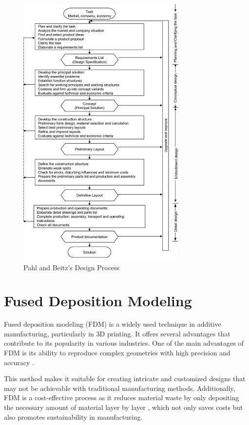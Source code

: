 \begin{figure}[ht!]
  \centering
  \includegraphics[width=0.75\textwidth]{texs/Part1/chapter1/image/pahlprocess.png}
  \caption{Pahl and Beitz's Design Process \cite[130]{Pahl2007}}
  \label{fig:pahlprocess}
\end{figure}

\section{Fused Deposition Modeling}
\label{sec:fused_deposition_modeling}

Fused deposition modeling (FDM) is a widely used technique in additive manufacturing, particularly in 3D printing. It offers several advantages that contribute to its popularity in various industries. One of the main advantages of FDM is its ability to reproduce complex geometries with high precision and accuracy \cite{Gordeev18}.

This method makes it suitable for creating intricate and customized designs that may not be achievable with traditional manufacturing methods. Additionally, FDM is a cost-effective process as it reduces material waste by only depositing the necessary amount of material layer by layer \cite{Gordeev18}, which not only saves costs but also promotes sustainability in manufacturing.

